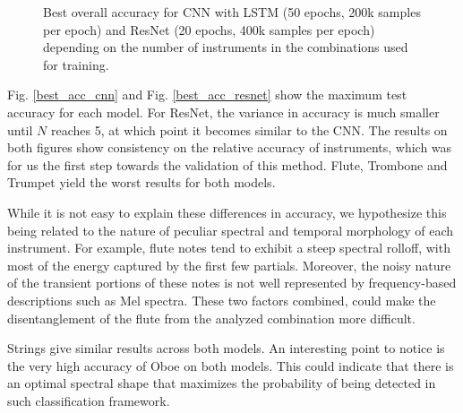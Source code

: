 \documentclass[runningheads,a4paper]{llncs}
\begin{document}
\begin{figure}
\caption{Best overall accuracy for CNN with LSTM (50 epochs, 200k samples per epoch) and ResNet (20 epochs, 400k samples per epoch) depending on the number of instruments in the combinations used for training. \label{cnn_vs_resnet}}
\end{figure}

Fig. \ref{best_acc_cnn} and Fig. \ref{best_acc_resnet} show the maximum test accuracy for each model. For ResNet, the variance in accuracy is much smaller until $N$ reaches 5, at which point it becomes similar to the CNN. The results on both figures show consistency on the relative accuracy of instruments, which was for us the first step towards the validation of this method. Flute, Trombone and Trumpet yield the worst results for both models. 

While it is not easy to explain these differences in accuracy, we hypothesize this being related to the nature of peculiar spectral and temporal morphology of each instrument. For example, flute notes tend to exhibit a steep spectral rolloff, with most of the energy captured by the first few partials. Moreover, the noisy nature of the transient portions of these notes is not well represented by frequency-based descriptions such as Mel spectra. These two factors combined, could make the disentanglement of the flute from the analyzed combination more difficult.

Strings give similar results across both models. An interesting point to notice is the very high accuracy of Oboe on both models. This could indicate that there is an optimal spectral shape that maximizes the probability of being detected in such classification framework.
\end{document}
